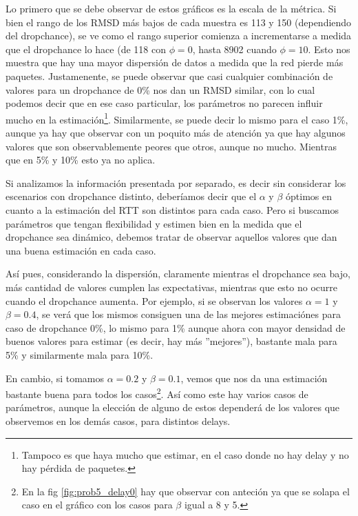 \par Lo primero que se debe observar de estos gr\'aficos es la escala de la
m\'etrica. Si bien el rango de los RMSD m\'as bajos de cada muestra es 113 y 150
(dependiendo del dropchance), se ve como el rango superior comienza a
incrementarse a medida que el dropchance lo hace (de 118 con $\phi = 0$, hasta
8902 cuando $\phi = 10$. Esto nos muestra que hay una mayor dispersi\'on de
datos a medida que la red pierde m\'as paquetes. Justamenente, se puede
observar que casi cualquier combinaci\'on de valores para un dropchance de 0\%
nos dan un RMSD similar, con lo cual podemos decir que en ese caso particular,
los par\'ametros no parecen influir mucho en la estimaci\'on\footnote{Tampoco es
que haya mucho que estimar, en el caso donde no hay delay y no hay p\'erdida de
paquetes.}. Similarmente, se puede decir lo mismo para el caso 1\%, aunque ya
hay que observar con un poquito m\'as de atenci\'on ya que hay algunos valores
que son observablemente peores que otros, aunque no mucho. Mientras que en 5\% y
10\% esto ya no aplica.

\par Si analizamos la informaci\'on presentada por separado, es decir sin
considerar los escenarios con dropchance distinto, deber\'iamos decir que el
$\alpha$ y $\beta$ \'optimos en cuanto a la estimaci\'on del RTT son distintos
para cada caso. Pero si buscamos par\'ametros que tengan flexibilidad y estimen
bien en la medida que el dropchance sea din\'amico, debemos tratar de observar
aquellos valores que dan una buena estimaci\'on en cada caso.

\par As\'i pues, considerando la dispersi\'on, claramente mientras el dropchance
sea bajo, m\'as cantidad de valores cumplen las expectativas, mientras que esto
no ocurre cuando el dropchance aumenta. Por ejemplo, si se observan los valores
$\alpha = 1$ y $\beta = 0.4$, se ver\'a que los mismos consiguen una de las
mejores estimaci\'ones para caso de dropchance 0\%, lo mismo para 1\% aunque
ahora con mayor densidad de buenos valores para estimar (es decir, hay m\'as
''mejores''), bastante mala para 5\% y similarmente mala para 10\%.

\par En cambio, si tomamos $\alpha = 0.2$ y $\beta = 0.1$, vemos que nos da una
estimaci\'on bastante buena para todos los casos\footnote{En la fig
\ref{fig:prob5_delay0} hay que observar con anteci\'on ya que se solapa el caso
en el gr\'afico con los casos para $\beta$ igual a 8 y 5.}. As\'i como este hay
varios casos de par\'ametros, aunque la elecci\'on de alguno de estos
depender\'a de los valores que observemos en los dem\'as casos, para distintos
delays.

